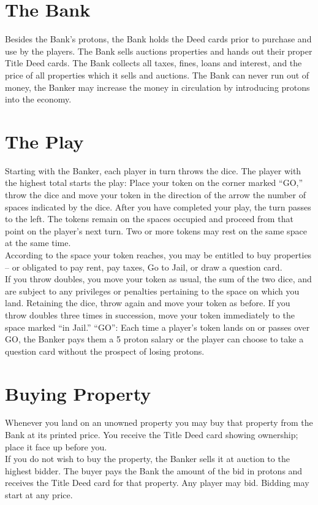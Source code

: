 \documentclass{article}
\begin{document}
\section{The Bank}
Besides the Bank’s protons, the Bank holds the Deed cards prior to purchase and use by the players. The Bank sells auctions properties and hands out their proper Title Deed cards. The Bank collects all taxes, fines, loans and interest, and the price of all properties which it sells and auctions. The Bank can never run out of money, the Banker may increase the money in circulation by introducing protons into the economy.
\section{The Play}
Starting with the Banker, each player in turn throws the dice. The player with the highest total starts the play: Place your token on the corner marked “GO,” throw the dice and move your token in the direction of the arrow the number of spaces indicated by the dice. After you have completed your play, the turn passes to the left. The tokens remain on the spaces occupied and proceed from that point on the player’s next turn. Two or more tokens may rest on the same space at the same time.\\ 
According to the space your token reaches, you may be entitled to buy properties – or obligated to pay rent, pay taxes, Go to Jail, or draw a question card.\\ 
	If you throw doubles, you move your token as usual, the sum of the two dice, and are subject to any privileges or penalties pertaining to the space on which you land. Retaining the dice, throw again and move your token as before. If you throw doubles three times in succession, move your token immediately to the space marked “in Jail.”
“GO”: Each time a player’s token lands on or passes over GO, the Banker pays them a 5 proton salary or the player can choose to take a question card without the prospect of losing protons. 

\section{Buying Property}
Whenever you land on an unowned property you may buy that property from the Bank at its printed price. You receive the Title Deed card showing ownership; place it face up before you.\\ 
	If you do not wish to buy the property, the Banker sells it at auction to the highest bidder. The buyer pays the Bank the amount of the bid in protons and receives the Title Deed card for that property. Any player may bid. Bidding may start at any price.
\end{document}
